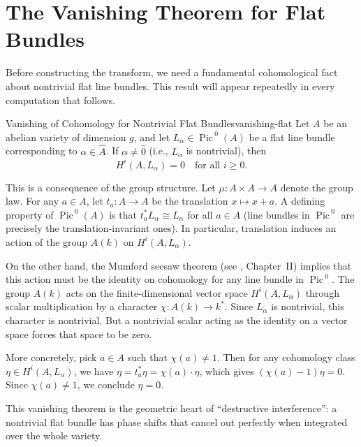 \documentclass{article}
\newcommand{\Pic}{{\operatorname{Pic}\,}}
\begin{document}
\section{The Vanishing Theorem for Flat Bundles}

Before constructing the transform, we need a fundamental cohomological fact about nontrivial flat line bundles. This result will appear repeatedly in every computation that follows.

\begin{prop}{Vanishing of Cohomology for Nontrivial Flat Bundles}{vanishing-flat}
Let $A$ be an abelian variety of dimension $g$, and let $L_\alpha \in \Pic^0(A)$ be a flat line bundle corresponding to $\alpha \in \hat{A}$. If $\alpha \neq \hat{0}$ (i.e., $L_\alpha$ is nontrivial), then
\[
    H^i(A, L_\alpha) = 0 \quad \text{for all } i \geq 0.
\]
\end{prop}

\begin{Proof}
This is a consequence of the group structure. Let $\mu\colon A \times A \to A$ denote the group law. For any $a \in A$, let $t_a\colon A \to A$ be the translation $x \mapsto x + a$. A defining property of $\Pic^0(A)$ is that $t_a^* L_\alpha \cong L_\alpha$ for all $a \in A$ (line bundles in $\Pic^0$ are precisely the translation-invariant ones). In particular, translation induces an action of the group $A(k)$ on $H^i(A, L_\alpha)$.

On the other hand, the Mumford seesaw theorem (see \cite{mumford-av}, Chapter~II) implies that this action must be the identity on cohomology for any line bundle in $\Pic^0$. The group $A(k)$ acts on the finite-dimensional vector space $H^i(A, L_\alpha)$ through scalar multiplication by a character $\chi\colon A(k) \to k^*$. Since $L_\alpha$ is nontrivial, this character is nontrivial. But a nontrivial scalar acting as the identity on a vector space forces that space to be zero.

More concretely, pick $a \in A$ such that $\chi(a) \neq 1$. Then for any cohomology class $\eta \in H^i(A, L_\alpha)$, we have $\eta = t_a^*\eta = \chi(a) \cdot \eta$, which gives $(\chi(a) - 1)\eta = 0$. Since $\chi(a) \neq 1$, we conclude $\eta = 0$.
\end{Proof}

This vanishing theorem is the geometric heart of ``destructive interference'': a nontrivial flat bundle has phase shifts that cancel out perfectly when integrated over the whole variety.
\end{document}
